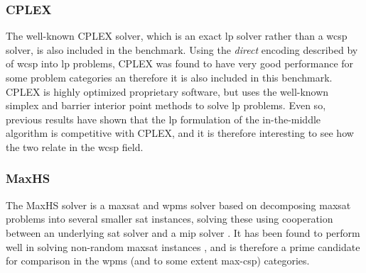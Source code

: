 \subsubsection{CPLEX}
The well-known CPLEX solver, which is an exact \gls{lp} solver rather than a \gls{wcsp} solver, is also included in the benchmark.
Using the \emph{direct} encoding described by \textcite[\pno~3]{deGivry14} of \gls{wcsp} into \gls{lp} problems, CPLEX was found to have very good performance for some problem categories an therefore it is also included in this benchmark.
CPLEX is highly optimized proprietary software, but uses the well-known simplex and barrier interior point methods to solve \gls{lp} problems.
Even so, previous results \parencite{Mason01,Ernst05} have shown that the \gls{lp} formulation of the in-the-middle algorithm is competitive with CPLEX, and it is therefore interesting to see how the two relate in the \gls{wcsp} field.

\subsubsection{MaxHS}
The MaxHS solver is a \gls{maxsat} and \gls{wpms} solver based on decomposing \gls{maxsat} problems into several smaller \gls{sat} instances, solving these using cooperation between an underlying \gls{sat} solver and a \gls{mip} solver \parencite{Davies11}.
It has been found to perform well in solving non-random \gls{maxsat} instances \parencite{Davies13}, and is therefore a prime candidate for comparison in the \gls{wpms} (and to some extent max-\gls{csp}) categories.
